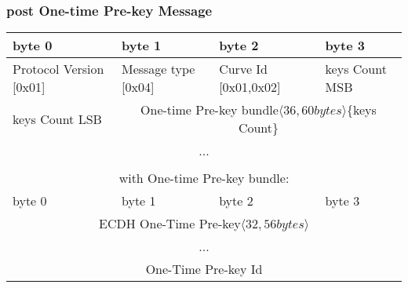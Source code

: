 \documentclass[a4paper,11pt]{article}
\begin{document}
    \subsubsection{post One-time Pre-key Message}
      \begin{center}
      \begin{tabular}{ | p{1.4in} | p{1.4in} | p{1.4in} | p{1.4in} |}
        \hline
        \cellcolor[gray]{0.85} byte 0 & \cellcolor[gray]{0.85} byte 1 & \cellcolor[gray]{0.85} byte 2 & \cellcolor[gray]{0.85}byte 3\\
        \hline
        Protocol Version [0x01] & Message type [0x04] & Curve Id [0x01,0x02] & keys Count MSB\\
        \hline
        keys Count LSB & \multicolumn{3}{c|}{One-time Pre-key bundle$\langle 36,60bytes\rangle $\{keys Count\}}\\
        \cline{1-1}
        \multicolumn{4}{|c|}{...}\\
        \hline
        \multicolumn{4}{c}{}\\
        \multicolumn{4}{c}{with One-time Pre-key bundle:}\\
        \hline
        \cellcolor[gray]{0.95} byte 0 & \cellcolor[gray]{0.95} byte 1 & \cellcolor[gray]{0.95} byte 2 & \cellcolor[gray]{0.95}byte 3\\
        \hline
        \multicolumn{4}{|c|}{ECDH One-Time Pre-key$\langle 32,56bytes\rangle$}\\
        \multicolumn{4}{|c|}{...}\\
        \hline
        \multicolumn{4}{|c|}{One-Time Pre-key Id}\\
        \hline
      \end{tabular}
      \end{center}
     
\end{document}
